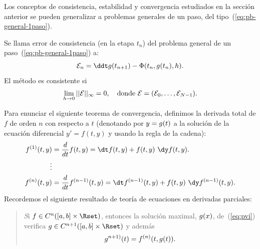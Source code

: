 Los conceptos de consistencia, estabilidad y convergencia estudiados
en la sección anterior se pueden generalizar a problemas generales de
un paso, del tipo~(\ref{eq:pb-general-1paso}).

\begin{definition}
  Se llama error de consistencia (en la etapa $t_n$) del problema
  general de un paso~(\ref{eq:pb-general-1paso}) a:
  $${\cal E}_n=\ddt \sol(\tnn) - \Phi(\tn,\sol(\tn),h).$$
  El método es consistente si
  $$
  \lim_{h\to 0} ||{\cal E}||_\infty  = 0, \quad \text{donde } {\cal
    E}=({\cal E}_0,\dots,{\cal E}_{N-1}).
  $$
\end{definition}

\newcommand{\Dtotal}[2]{#2^{(#1)}}%
Para enunciar el siguiente teorema de convergencia, definimos la
derivada total de $f$ de orden $n$ con respecto a $t$ (denotando por
$y=g(t)$ a la solución de la ecuación diferencial $y'=f(t,y)$ y
usando la regla de la cadena):
\begin{align*}
  \Dtotal 1 f(t,y) & = \frac{d}{dt}f(t,y) =
                     \dt f(t,y)
                     + f(t,y)\ \dy f (t,y).
  \\
  \vdots
  \\
  \Dtotal n f(t,y) &= \frac{d}{dt}\Dtotal{n-1}f(t,y) =
                     \dt \Dtotal {n-1} f(t,y)
                     + f(t,y) \ \dy\Dtotal {n-1}f (t,y).
\end{align*}
Recordemos el siguiente resultado de teoría de ecuaciones en derivadas
parciales:
\begin{quotation}
  \emph Si $f\in C^n([\ta,\tb]\times\Rset)$, entonces la solución
  maximal, $g(x)$, de~(\ref{eq:pvi}) verifica $\sol\in
  C^{n+1}([\ta,\tb]\times\Rset)$ y además $$g^{n+1)}(t)=\Dtotal n f(t,
  \sol(t)).$$
\end{quotation}

